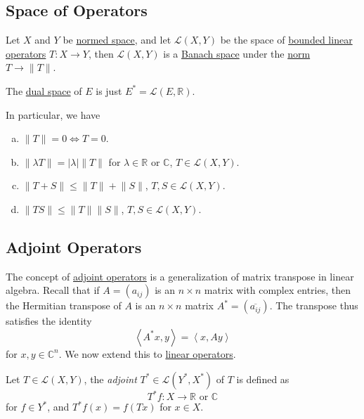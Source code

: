 \subsection{Space of Operators}
Let \(X\) and \(Y\) be \hyperref[def:normed-vector-space]{normed space}, and let \(\mathcal{L} (X, Y) \) be the space of \hyperref[def:bounded-linear-op]{bounded linear operators} \(T\colon X\to Y\), then \(\mathcal{L} (X, Y)\) is a \hyperref[def:Banach-space]{Banach space} under the \hyperref[def:norm]{norm} \(T\to \lVert T\rVert \).

\begin{eg}
	The \hyperref[def:dual-space]{dual space} of \(E\) is just \(E^{\ast} = \mathcal{L} (E, \mathbb{R} )\).
\end{eg}

\begin{remark}
	In particular, we have
	\begin{enumerate}[(a)]
		\item \(\lVert T\rVert = 0 \iff T = 0\).
		\item \(\lVert \lambda T\rVert = \left\vert \lambda  \right\vert \lVert T\rVert  \) for \(\lambda \in \mathbb{R} \) or \(\mathbb{C} \), \(T\in \mathcal{L} (X, Y)\).
		\item \(\lVert T + S\rVert \leq \lVert T\rVert + \lVert S\rVert \), \(T, S \in \mathcal{L} (X, Y)\).
		\item \(\lVert TS\rVert \leq \lVert T\rVert \lVert S\rVert \), \(T, S\in \mathcal{L} (X, Y)\).
	\end{enumerate}
\end{remark}

\subsection{Adjoint Operators}
The concept of \hyperref[def:adjoint-op]{adjoint operators} is a generalization of matrix transpose in linear algebra. Recall that if \(A = (a_{ij} )\) is an \(n\times n\) matrix with complex entries, then the Hermitian transpose of \(A\) is an \(n\times n\) matrix \(A^{\ast} = (\overline{a_{ij}})\). The transpose thus satisfies the identity
\[
	\left\langle A^{\ast} x, y \right\rangle = \left\langle x, Ay \right\rangle
\]
for \(x, y\in \mathbb{C} ^n\). We now extend this to \hyperref[def:linear-op]{linear operators}.

\begin{definition}\label{def:adjoint-op}
	Let \(T\in \mathcal{L} (X, Y)\), the \emph{adjoint} \(T^{\ast} \in \mathcal{L} (Y^{\ast} , X^{\ast} )\) of \(T\) is defined as
	\[
		T^{\ast} f\colon X\to \mathbb{R} \text{ or }\mathbb{C}
	\]
	for \(f\in Y^{\ast}\), and \(T^{\ast} f(x) = f(Tx)\) for \(x\in X\).
\end{definition}

